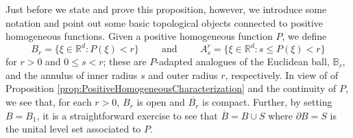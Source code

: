 \documentclass[11pt, letter]{book}
\begin{document}
Just before we state and prove this proposition, however, we introduce some notation and point out some basic topological objects connected to positive homogeneous functions.  Given a positive homogeneous function $P$, we define
\begin{equation*}
B_r=\{\xi\in\mathbb{R}^d:P(\xi)<r\}\hspace{1cm}\mbox{and}\hspace{1cm}A_s^r=\{\xi\in\mathbb{R}^d:s\leq P(\xi)<r\}
\end{equation*}
for $r>0$ and $0\leq s<r$; these are $P$-adapted analogues of the Euclidean ball, $\mathbb{B}_r$, and the annulus of inner radius $s$ and outer radius $r$, respectively. In view of of Proposition \ref{prop:PositiveHomogeneousCharacterization} and the continuity of $P$, we see that, for each $r>0$, $B_r$ is open and $\overline{B_r}$ is compact. Further, by setting $B=B_1$, it is a straightforward exercise to see that $\overline{B}=B\cup S$ where $\partial B=S$ is the unital level set associated to $P$. 
\end{document}
